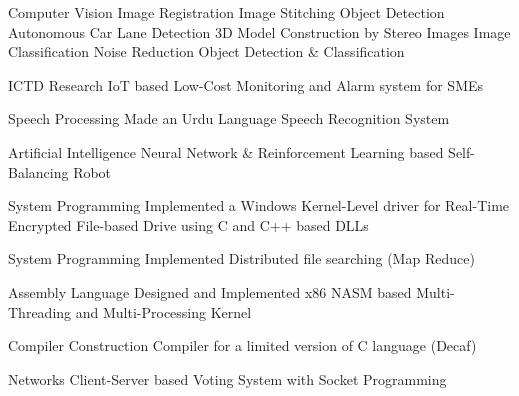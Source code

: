 

\begin{cvprojects}

  \cvproject
    {Computer Vision} %
    {Image Registration \acvSep Image Stitching \acvSep Object Detection \acvSep Autonomous Car Lane Detection \acvSep 3D Model Construction by Stereo Images \acvSep Image Classification \acvSep Noise Reduction \acvSep Object Detection \& Classification} %

  \cvproject
    {ICTD Research} %
    {IoT based Low-Cost Monitoring and Alarm system for SMEs} %

  \cvproject
    {Speech Processing} %
    {Made an Urdu Language Speech Recognition System} %

  \cvproject
    {Artificial Intelligence} %
    {Neural Network \& Reinforcement Learning based Self-Balancing Robot} %

  \cvproject
    {System Programming} %
    {Implemented a Windows Kernel-Level driver for Real-Time Encrypted File-based Drive using C and C++ based DLLs} %

  \cvproject
    {System Programming} %
    {Implemented Distributed file searching (Map Reduce)} %

  \cvproject
    {Assembly Language} %
    {Designed and Implemented x86 NASM based Multi-Threading and Multi-Processing Kernel} %

  \cvproject
    {Compiler Construction} %
    {Compiler for a limited version of C language (Decaf)} %

  \cvproject
    {Networks} %
    {Client-Server based Voting System with Socket Programming} %


\end{cvprojects}
